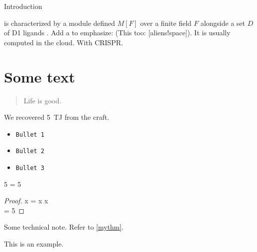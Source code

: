 
\begin{MainChapter}{Introduction}




 is characterized by a module defined $M[F]$ over a finite field $F$ alongside a set $D$ of \ac{D1} ligands \cite{yolov6}. Add a \term{*} to emphasize:  (This too: [aliens!space]).
It is usually computed in the cloud. With \ac{CRISPR}.

\section{Some text}

\blockcquote{johnson2022}{Life is good.}

We recovered \qty{5}{\tera\joule} from the craft.

\begin{itemize}
    \item\texttt{Bullet 1}
    \item\texttt{Bullet 2}
    \item\texttt{Bullet 3}
\end{itemize}

\begin{criterion}[label=mythm, name=Fiveness]
5 = 5
\end{criterion}

\begin{proof}
x = x \forall x\\
 = 5
\end{proof}

\begin{BoxNote}
Some technical note.
Refer to \cref{mythm}.
\end{BoxNote}

\begin{BoxExample}
This is an example.
\end{BoxExample}



\end{MainChapter}
